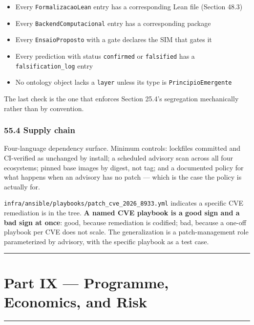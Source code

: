 \documentclass[
  11pt]{report}
\providecommand{\tightlist}{%
  \setlength{\itemsep}{0pt}\setlength{\parskip}{0pt}}
\begin{document}
\begin{itemize}
\tightlist
\item
  Every \texttt{FormalizacaoLean} entry has a corresponding Lean file
  (Section 48.3)
\item
  Every \texttt{BackendComputacional} entry has a corresponding package
\item
  Every \texttt{EnsaioProposto} with a gate declares the SIM that gates
  it
\item
  Every prediction with status \texttt{confirmed} or \texttt{falsified}
  has a \texttt{falsification\_log} entry
\item
  No ontology object lacks a \texttt{layer} unless its type is
  \texttt{PrincipioEmergente}
\end{itemize}

The last check is the one that enforces Section 25.4's segregation
mechanically rather than by convention.

\hypertarget{supply-chain}{%
\section{55.4 Supply chain}\label{supply-chain}}

Four-language dependency surface. Minimum controls: lockfiles committed
and CI-verified as unchanged by install; a scheduled advisory scan
across all four ecosystems; pinned base images by digest, not tag; and a
documented policy for what happens when an advisory has no patch ---
which is the case the policy is actually for.

\texttt{infra/ansible/playbooks/patch\_cve\_2026\_8933.yml} indicates a
specific CVE remediation is in the tree. \textbf{A named CVE playbook is
a good sign and a bad sign at once}: good, because remediation is
codified; bad, because a one-off playbook per CVE does not scale. The
generalization is a patch-management role parameterized by advisory,
with the specific playbook as a test case.

\begin{center}\rule{0.5\linewidth}{0.5pt}\end{center}

\hypertarget{part-ix-programme-economics-and-risk}{%
\part{Part IX --- Programme, Economics, and
Risk}\label{part-ix-programme-economics-and-risk}}

\begin{center}\rule{0.5\linewidth}{0.5pt}\end{center}
\end{document}
